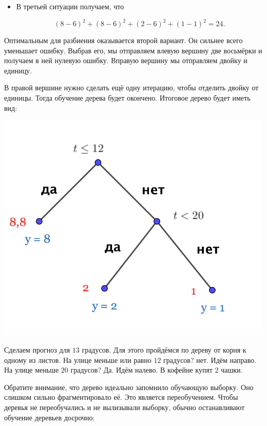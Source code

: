 \documentclass[12pt, a4paper, oneside]{article}
\begin{document}
{\begin{itemize}
		\[ (8 - 8)^2 + (8 - 8)^2 + (2 - 1.5)^2 + (1 - 1.5)^2 = 0.5.  \]
		
		\item В третьей ситуации получаем, что 
		
		\[ (8 - 6)^2 + (8 - 6)^2 + (2 - 6)^2 + (1 - 1)^2 = 24.  \]
	\end{itemize}
	
	Оптимальным для разбиения оказывается второй вариант. Он сильнее всего уменьшает ошибку.  Выбрав его, мы отправляем влевую вершину две восьмёрки и получаем в ней нулевую ошибку. Вправую вершину мы отправляем двойку и единицу. 
	
	В правой вершине нужно сделать ещё одну итерацию, чтобы отделить двойку от единицы. Тогда обучение дерева будет окончено. Итоговое дерево будет иметь вид: 
	
	\begin{center}
		\includegraphics[scale=0.23]{reg_tree_2.png}
	\end{center}
	
	Сделаем прогноз для $13$ градусов.  Для этого пройдёмся по дереву от корня к одному из листов. На улице меньше или равно $12$ градусов?  нет. Идём направо. На улице меньше $20$ градусов? Да. Идём налево. В кофейне купят $2$ чашки. 
	
	Обратите внимание, что дерево идеально запомнило обучающую выборку. Оно слишком сильно фрагментировало её. Это является переобучением. Чтобы деревья не переобучались и не вылизывали выборку, обычно останавливают обучение деревьев досрочно: 
	
}
\end{document}
